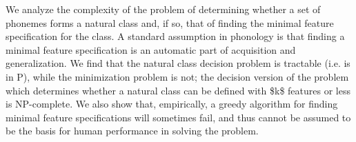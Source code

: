 We analyze the complexity of the problem of determining whether a set of phonemes forms a natural class and, if so, that of finding the minimal feature specification for the class. A standard assumption in phonology is that finding a minimal feature specification is an automatic part of acquisition and generalization.  We find that the natural class decision problem is tractable (i.e. is in P), while the  minimization problem is not; the decision version of the problem which determines whether a natural class can be defined with \$k\$ features or less is NP-complete. We also show that, empirically, a greedy algorithm for finding minimal feature specifications will sometimes fail, and thus cannot be assumed to be the basis for human performance in solving the problem.
